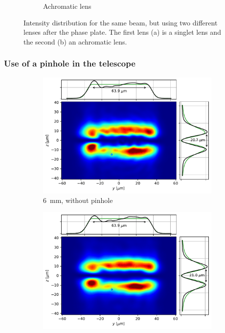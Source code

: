 \begin{figure}
\begin{subfigure}{0.45\textwidth}
        \caption{Achromatic lens}
        \label{fig:achr}
    \end{subfigure}
    \caption{Intensity distribution for the same beam, but using two different lenses after the phase plate. The first lens (a) is a singlet lens and the second (b) an achromatic lens.}
    \label{fig:sing_achr}
\end{figure}

\subsubsection{Use of a pinhole in the telescope}

\begin{figure}
    \centering
    \begin{subfigure}{0.45\textwidth}
        \includegraphics[width=\textwidth]{chapters/chapter_3/figures/large_nopin.pdf}
        \caption{\SI{6}{mm}, without pinhole}
    \end{subfigure}
    \hfill
    \begin{subfigure}{0.45\textwidth}
        \includegraphics[width=\textwidth]{chapters/chapter_3/figures/large_pin.pdf}

\end{subfigure}
\end{figure}
